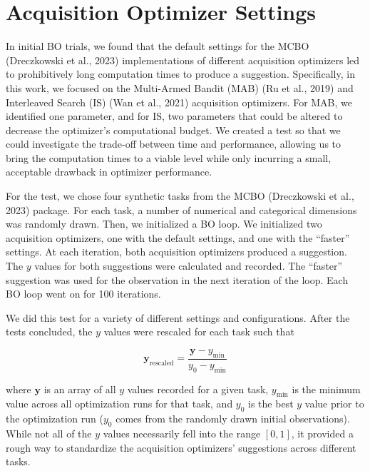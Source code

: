 \documentclass[12pt,twoside]{reedthesis}
\begin{document}
\hypertarget{acqOptimTests}{%
\chapter{Acquisition Optimizer Settings}\label{acqOptimTests}}

In initial BO trials, we found that the default settings for the MCBO (Dreczkowski et al., 2023) implementations of different acquisition optimizers led to prohibitively long computation times to produce a suggestion. Specifically, in this work, we focused on the Multi-Armed Bandit (MAB) (Ru et al., 2019) and Interleaved Search (IS) (Wan et al., 2021) acquisition optimizers. For MAB, we identified one parameter, and for IS, two parameters that could be altered to decrease the optimizer's computational budget. We created a test so that we could investigate the trade-off between time and performance, allowing us to bring the computation times to a viable level while only incurring a small, acceptable drawback in optimizer performance.

For the test, we chose four synthetic tasks from the MCBO (Dreczkowski et al., 2023) package. For each task, a number of numerical and categorical dimensions was randomly drawn. Then, we initialized a BO loop. We initialized two acquisition optimizers, one with the default settings, and one with the ``faster'' settings. At each iteration, both acquisition optimizers produced a suggestion. The \(y\) values for both suggestions were calculated and recorded. The ``faster'' suggestion was used for the observation in the next iteration of the loop. Each BO loop went on for 100 iterations.

We did this test for a variety of different settings and configurations. After the tests concluded, the \(y\) values were rescaled for each task such that

\[\textbf{y}_{\text{rescaled}}=\frac{\textbf{y}-y_{\min}}{y_0-y_{\min}}\]

where \(\textbf{y}\) is an array of all \(y\) values recorded for a given task, \(y_{\min}\) is the minimum value across all optimization runs for that task, and \(y_0\) is the best \(y\) value prior to the optimization run (\(y_0\) comes from the randomly drawn initial observations). While not all of the \(y\) values necessarily fell into the range \([0,1]\), it provided a rough way to standardize the acquisition optimizers' suggestions across different tasks.
\end{document}
